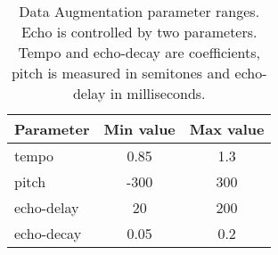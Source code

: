 \documentclass[11pt,a4paper]{article}
\begin{document}
        \begin{table}[t]
            \centering
            \begin{tabular}{lcc}
                \hline
                Parameter  & Min value & Max value \\ \hline
                tempo      & 0.85      & 1.3       \\
                pitch      & -300      & 300       \\
                echo-delay & 20        & 200       \\
                echo-decay & 0.05      & 0.2       \\ \hline
            \end{tabular}
            \caption{Data Augmentation parameter ranges. Echo is controlled by two parameters. Tempo and echo-decay are coefficients, pitch is measured in semitones and echo-delay in milliseconds.}
            \label{tab:aug}
        \end{table}
        
\end{document}
